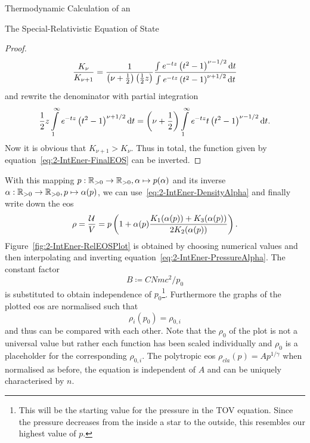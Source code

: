 \begin{section}{Thermodynamic Calculation of an \texorpdfstring{}{EoS}}
\begin{subsection}{The Special-Relativistic Equation of State}
\begin{proof}
\begin{equation}
		\frac{K_\nu}{K_{\nu+1}} = \frac{1}{\left(\nu+\frac{1}{2}\right)\left(\frac{1}{2}z\right)}\frac{\int\mathit{e}^{-tz}\left(t^2-1\right)^{\nu-1/2}\mathop{}\!\mathrm{d} t}{\int\mathit{e}^{-tz}\left(t^2-1\right)^{\nu+1/2}\mathop{}\!\mathrm{d} t}
		\label{eq:2-IntEner-BesselK-Ratio}
	\end{equation}
	and rewrite the denominator with partial integration
	\begin{equation}
		 \frac{1}{2}z\int\limits_1^\infty\mathit{e}^{-tz}\left(t^2-1\right)^{\nu+1/2}\mathop{}\!\mathrm{d} t = \left(\nu+\frac{1}{2}\right)\int\limits_1^\infty \mathit{e}^{-tz}t\left(t^2-1\right)^{\nu-1/2}\mathop{}\!\mathrm{d} t.
		 \label{eq:2-IntEner-BesselK-Integral-Evaluation}
	\end{equation}
	Now it is obvious that $K_{\nu+1}>K_\nu$.
	Thus in total, the function given by equation~\eqref{eq:2-IntEner-FinalEOS} can be inverted.
\end{proof}%
%
%
\noindent With this mapping $p:\mathbb{R}_{>0}\rightarrow \mathbb{R}_{>0},\alpha\mapsto p(\alpha)$ and its inverse $\alpha:\mathbb{R}_{>0}\rightarrow \mathbb{R}_{>0},p\mapsto \alpha(p)$, we can use~\eqref{eq:2-IntEner-DensityAlpha} and finally write down the \ac{eos}
\begin{equation}
	\rho = \frac{\mathcal{U}}{V} = p\left(1+\alpha(p)\frac{K_1 (\alpha(p))+K_3(\alpha(p))}{2K_2 (\alpha(p))}\right).
	\label{eq:2-IntEner-FinalEOS}
\end{equation}
Figure~\ref{fig:2-IntEner-RelEOSPlot} is obtained by choosing numerical values and then interpolating and inverting equation~\eqref{eq:2-IntEner-PressureAlpha}.
The constant factor
\begin{equation}
	B\coloneqq CNmc^2/p_0
	\label{eq:2-IntEner-FactorExplanation}
\end{equation}
is substituted to obtain independence of $p_0$\footnote{This will be the starting value for the pressure in the \acl{TOV} equation. Since the pressure decreases from the inside a star to the outside, this resembles our highest value of $p$.}.
Furthermore the graphs of the plotted \ac{eos} are normalised such that
\begin{equation}
	\rho_{i}(p_0)=\rho_{0,i}
	\label{eq:2-IntEner-Plt-Initial-Val-Def}
\end{equation}
and thus can be compared with each other.
Note that the $\rho_0$ of the plot is not a universal value but rather each function has been scaled individually and $\rho_0$ is a placeholder for the corresponding $\rho_{0,i}$.
The polytropic \ac{eos} $\rho_{cla}(p)=Ap^{1/\gamma}$ when normalised as before, the equation is independent of $A$ and can be uniquely characterised by $n$. %

\end{subsection}
\end{section}
